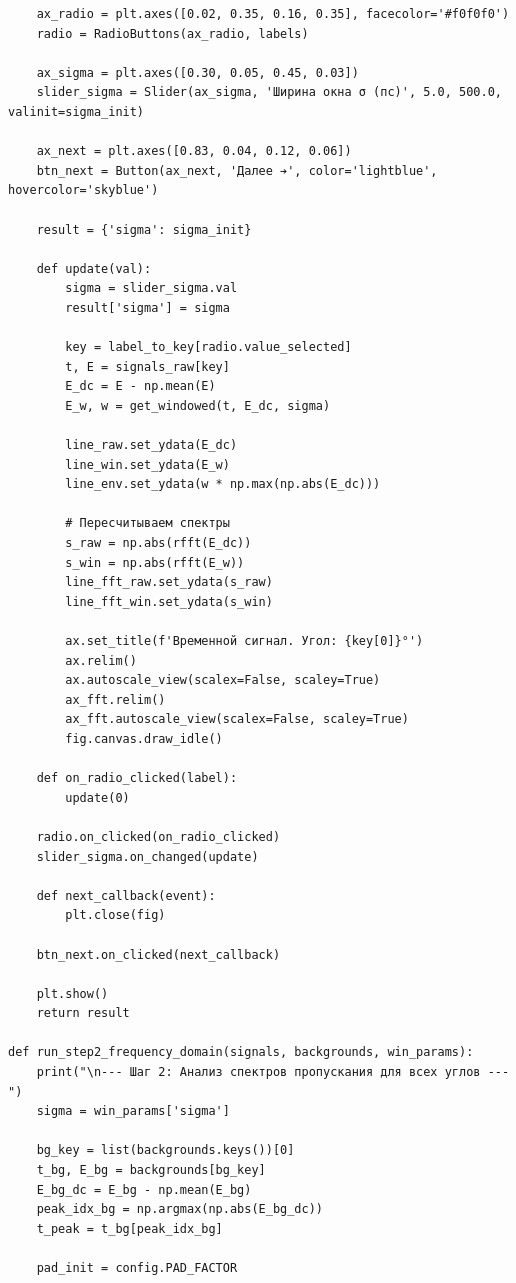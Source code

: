 \begin{verbatim}
    ax_radio = plt.axes([0.02, 0.35, 0.16, 0.35], facecolor='#f0f0f0')
    radio = RadioButtons(ax_radio, labels)
    
    ax_sigma = plt.axes([0.30, 0.05, 0.45, 0.03])
    slider_sigma = Slider(ax_sigma, 'Ширина окна σ (пс)', 5.0, 500.0, valinit=sigma_init)
    
    ax_next = plt.axes([0.83, 0.04, 0.12, 0.06])
    btn_next = Button(ax_next, 'Далее ➔', color='lightblue', hovercolor='skyblue')
    
    result = {'sigma': sigma_init}
    
    def update(val):
        sigma = slider_sigma.val
        result['sigma'] = sigma
        
        key = label_to_key[radio.value_selected]
        t, E = signals_raw[key]
        E_dc = E - np.mean(E)
        E_w, w = get_windowed(t, E_dc, sigma)
        
        line_raw.set_ydata(E_dc)
        line_win.set_ydata(E_w)
        line_env.set_ydata(w * np.max(np.abs(E_dc)))
        
        # Пересчитываем спектры
        s_raw = np.abs(rfft(E_dc))
        s_win = np.abs(rfft(E_w))
        line_fft_raw.set_ydata(s_raw)
        line_fft_win.set_ydata(s_win)
        
        ax.set_title(f'Временной сигнал. Угол: {key[0]}°')
        ax.relim()
        ax.autoscale_view(scalex=False, scaley=True)
        ax_fft.relim()
        ax_fft.autoscale_view(scalex=False, scaley=True)
        fig.canvas.draw_idle()
        
    def on_radio_clicked(label):
        update(0)
        
    radio.on_clicked(on_radio_clicked)
    slider_sigma.on_changed(update)
    
    def next_callback(event):
        plt.close(fig)
        
    btn_next.on_clicked(next_callback)
    
    plt.show()
    return result

def run_step2_frequency_domain(signals, backgrounds, win_params):
    print("\n--- Шаг 2: Анализ спектров пропускания для всех углов ---")
    sigma = win_params['sigma']
    
    bg_key = list(backgrounds.keys())[0]
    t_bg, E_bg = backgrounds[bg_key]
    E_bg_dc = E_bg - np.mean(E_bg)
    peak_idx_bg = np.argmax(np.abs(E_bg_dc))
    t_peak = t_bg[peak_idx_bg]
    
    pad_init = config.PAD_FACTOR
    

\end{verbatim}
